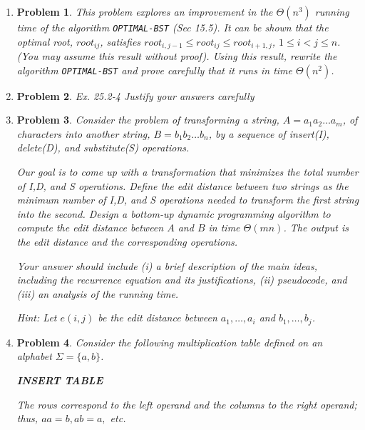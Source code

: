 \documentclass[a4paper]{article}
\newtheorem*{problem}{Problem}
\begin{document}
\begin{enumerate}
  \item
    \begin{problem}
      This problem explores an improvement in the $\Theta(n^3)$ running time of the algorithm \texttt{OPTIMAL-BST} (Sec 15.5). It can be shown that
      the optimal root, $root_{ij}$, satisfies $root_{i,j-1} \leq root_{ij} \leq root_{i+1,j}$, $1 \leq i < j \leq n$. (You may assume this result
      without proof). Using this result, rewrite the algorithm \texttt{OPTIMAL-BST} and prove carefully that it runs in time $\Theta(n^2)$.
    \end{problem}

  \item
    \begin{problem}
      Ex. 25.2-4 Justify your answers carefully
    \end{problem}

  \item
    \begin{problem}

      Consider the problem of transforming a string, $A = a_1 a_2 \dots a_m$, of characters into another string, $B=b_1 b_2 \dots b_n$, by a sequence
      of insert(I), delete(D), and substitute(S) operations.

      Our goal is to come up with a transformation that minimizes the total number of I,D, and S operations. Define the edit distance between two
      strings as the minimum number of I,D, and S operations needed to transform the first string into the second. Design a bottom-up dynamic
      programming algorithm to compute the edit distance between $A$ and $B$ in time $\Theta(mn)$. The output is the edit distance and the
      corresponding operations.

      Your answer should include (i) a brief description of the main ideas, including the recurrence equation and its justifications, (ii) pseudocode,
      and (iii) an analysis of the running time.

      Hint: Let $e(i,j)$ be the edit distance between $a_1, \dots, a_i$ and $b_1, \dots, b_j$.

    \end{problem}

  \item
    \begin{problem}
      Consider the following multiplication table defined on an alphabet $\Sigma = \{a, b\}$.

      \large{\textbf{INSERT TABLE}}

      The rows correspond to the left operand and the columns to the right operand; thus, $aa = b, ab = a,$ etc.


\end{problem}
\end{enumerate}
\end{document}

